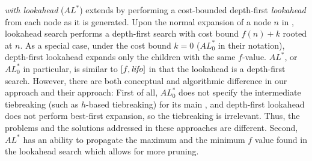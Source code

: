 \emph{\astar with lookahead} ($AL^*$) \cite{stern2010look} extends \astar by performing a cost-bounded depth-first \emph{lookahead} from each node as it is generated. Upon the normal expansion of a node $n$ in \astar, lookahead search performs a depth-first search with cost bound $f(n)+k$ rooted at $n$. As a special case, under the cost bound $k=0$ ($AL^*_0$ in their notation), depth-first lookahead expands only the children with the same $f$-value.
$AL^*$, or $AL^*_0$ in particular, is similar to $[f,{\text{\textit{lifo}}}]$ in that the lookahead is a depth-first search.
However, there are both conceptual and algorithmic difference in our approach and their approach:
First of all, $AL^*_0$ does not specify the intermediate tiebreaking (such as $h$-based tiebreaking) for its main \astar, and depth-first lookahead does not perform best-first expansion, so the tiebreaking is irrelevant. Thus, the problems and the solutions addressed in these approaches are different.
Second, $AL^*$ has an ability to propagate the maximum and the minimum $f$ value found in the lookahead search which allows for more pruning.
